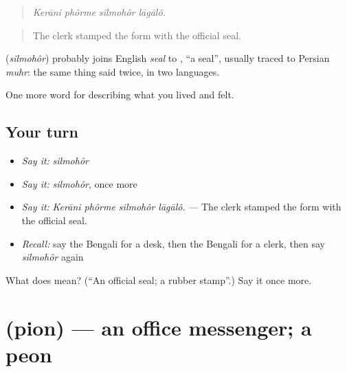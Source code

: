 \begin{quote}
   
\end{quote}

\begin{quote}
\emph{Kerāni phôrme silmohôr lāgālô.}
\end{quote}

\begin{quote}
The clerk stamped the form with the official seal.
\end{quote}

\begin{cousinweb}
\textbf{} (\emph{silmohôr}) probably joins English \emph{seal} to , \textquotedblleft{}a seal\textquotedblright{}, usually traced to Persian \emph{muhr}: the same thing said twice, in two languages.
\end{cousinweb}

\begin{grammarlens}[title={What you've built}]
One more word for describing what you lived and felt.
\end{grammarlens}

\subsection*{Your turn}
\begin{itemize}
\raggedright
  \item \emph{Say it:} \emph{silmohôr}
  \item \emph{Say it:} \emph{silmohôr}, once more
  \item \emph{Say it:} \emph{Kerāni phôrme silmohôr lāgālô.} — The clerk stamped the form with the official seal.
  \item \emph{Recall:} say the Bengali for a desk, then the Bengali for a clerk, then say \emph{silmohôr} again
\end{itemize}

\begin{tcolorbox}[breakable,colback=teal!4,colframe=teal!35!black,title={Before you move on}]
What does  mean? (\textquotedblleft{}An official seal; a rubber stamp\textquotedblright{}.) Say it once more.
\end{tcolorbox}
\section[\texorpdfstring{\bn{পিওন} (pion)}{পিওন (pion)}]{ (pion) — an office messenger; a peon}

